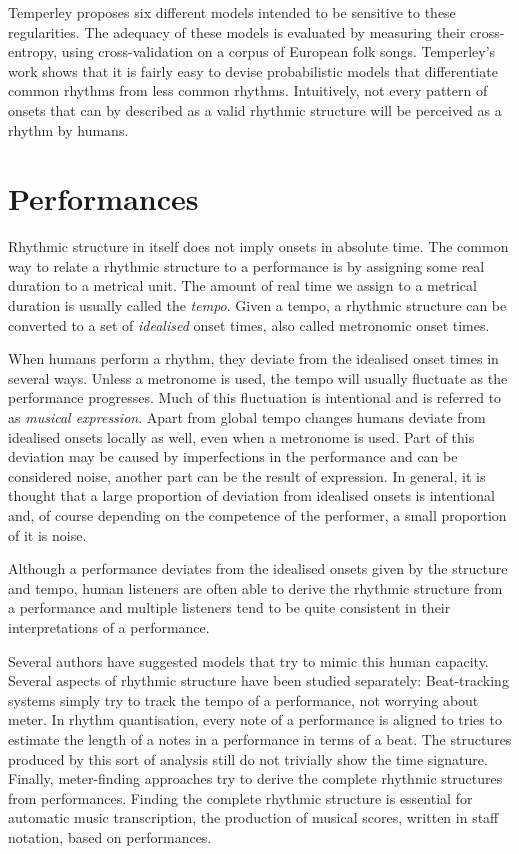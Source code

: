 Temperley proposes six different models intended to be sensitive to these regularities. The adequacy of these models is evaluated by measuring their cross-entropy, using cross-validation on a corpus of European folk songs. Temperley's work shows that it is fairly easy to devise probabilistic models that differentiate common rhythms from less common rhythms. Intuitively, not every pattern of onsets that can by described as a valid rhythmic structure will be perceived as a rhythm by humans. 


\section{Performances}
\label{sec:performances}

Rhythmic structure in itself does not imply onsets in absolute time. The common way to relate a rhythmic structure to a performance is by assigning some real duration to a metrical unit. The amount of real time we assign to a metrical duration is usually called the \textit{tempo}. Given a tempo, a rhythmic structure can be converted to a set of \textit{idealised} onset times, also called metronomic onset times. 

When humans perform a rhythm, they deviate from the idealised onset times in several ways. Unless a metronome is used, the tempo will usually fluctuate as the performance progresses. Much of this fluctuation is intentional and is referred to as \textit{musical expression}. Apart from global tempo changes humans deviate from idealised onsets locally as well, even when a metronome is used. Part of this deviation may be caused by imperfections in the performance and can be considered noise, another part can be the result of expression. In general, it is thought that a large proportion of deviation from idealised onsets is intentional and, of course depending on the competence of the performer, a small proportion of it is noise.

Although a performance deviates from the idealised onsets given by the structure and tempo, human listeners are often able to derive the rhythmic structure from a performance and multiple listeners tend to be quite consistent in their interpretations of a performance. 

Several authors have suggested models that try to mimic this human capacity. Several aspects of rhythmic structure have been studied separately: Beat-tracking systems simply try to track the tempo of a performance, not worrying about meter. In rhythm quantisation, every note of a performance is aligned to tries to estimate the length of a notes in a performance in terms of a beat. The structures produced by this sort of analysis still do not trivially show the time signature. Finally, meter-finding approaches try to derive the complete rhythmic structures from performances. Finding the complete rhythmic structure is essential for automatic music transcription, the production of musical scores, written in staff notation, based on performances.



